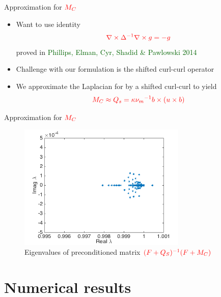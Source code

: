 \documentclass[12pt]{beamer}
\newcommand{\gr}[1]{\textcolor{darkgreen} {#1}}
\newcommand{\re}[1]{{\textcolor{red}       {#1}}}
\begin{document}
\begin{frame}{Approximation for $\re{M_C}$}

\begin{itemize}
  \item Want to use identity
$$\re{  \nabla \times \Delta^{-1} \nabla \times {g} = -{g}
}$$
proved in \gr{Phillips, Elman, Cyr, Shadid \& Pawlowski 2014}

\item Challenge with our formulation is the shifted curl-curl operator

\item We approximate the Laplacian for by a shifted curl-curl to yield
$$\re{{M_C}\approx Q_s = {\kappa}{\nu_m}^{-1} {b} \times ({u}\times{b})}$$

\end{itemize}


\end{frame}

\begin{frame}{Approximation for $\re{M_C}$}

\begin{figure}[h]
    \begin{center}
    \includegraphics[width=80mm]{figures/mass}
    \end{center}
    \caption{Eigenvalues of preconditioned matrix $\re{(F+Q_S)^{-1}(F+M_C)}$ }
    \label{pics:blablabla}
\end{figure}
\end{frame}

\section{Numerical results}
\end{document}
